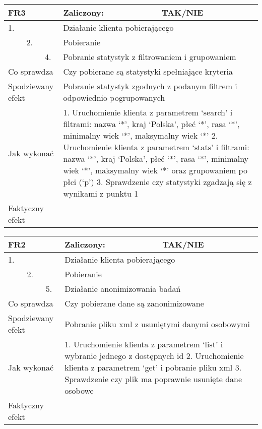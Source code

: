 \begin{tabular}{|p{20pt}|p{20pt}|p{20pt}|p{250pt}|p{60pt}|}
	\hline
	\multicolumn{3}{|p{70pt}|}{FR3} & Zaliczony: & TAK/NIE \\ \hline
	1. & & & \multicolumn{2}{|p{310pt}|}{Działanie klienta pobierającego } \\ \hline
	& 2. & & \multicolumn{2}{|p{310pt}|}{Pobieranie } \\ \hline
	& & 4. & \multicolumn{2}{|p{310pt}|}{Pobranie statystyk z filtrowaniem i grupowaniem } \\ \hline
	\multicolumn{3}{|p{70pt}|}{Co sprawdza} & \multicolumn{2}{|p{310pt}|}{Czy pobierane są statystyki spełniające kryteria} \\ \hline
	\multicolumn{3}{|p{70pt}|}{Spodziewany efekt} & \multicolumn{2}{|p{310pt}|}{Pobranie statystyk zgodnych z podanym filtrem i odpowiednio pogrupowanych} \\ \hline
	\multicolumn{3}{|p{70pt}|}{Jak wykonać} & \multicolumn{2}{|p{310pt}|}{1. Uruchomienie klienta z parametrem ‘search’ i filtrami: nazwa ‘*’, kraj ‘Polska’, płeć ‘*’, rasa ‘*’, minimalny wiek ‘*’, maksymalny wiek ‘*’
2. Uruchomienie klienta z parametrem ‘stats’ i filtrami: nazwa ‘*’, kraj ‘Polska’, płeć ‘*’, rasa ‘*’, minimalny wiek ‘*’, maksymalny wiek ‘*’ oraz grupowaniem po płci (‘p’)
3. Sprawdzenie czy statystyki zgadzają się z wynikami z punktu 1} \\ \hline
	\multicolumn{3}{|p{70pt}|}{Faktyczny efekt} & \multicolumn{2}{|p{310pt}|}{} \\ \hline
\end{tabular}

\begin{tabular}{|p{20pt}|p{20pt}|p{20pt}|p{250pt}|p{60pt}|}
	\hline
	\multicolumn{3}{|p{70pt}|}{FR2} & Zaliczony: & TAK/NIE \\ \hline
	1. & & & \multicolumn{2}{|p{310pt}|}{Działanie klienta pobierającego } \\ \hline
	& 2. & & \multicolumn{2}{|p{310pt}|}{Pobieranie } \\ \hline
	& & 5. & \multicolumn{2}{|p{310pt}|}{Działanie anonimizowania badań } \\ \hline
	\multicolumn{3}{|p{70pt}|}{Co sprawdza} & \multicolumn{2}{|p{310pt}|}{Czy pobierane dane są zanonimizowane} \\ \hline
	\multicolumn{3}{|p{70pt}|}{Spodziewany efekt} & \multicolumn{2}{|p{310pt}|}{Pobranie pliku xml z usuniętymi danymi osobowymi} \\ \hline
	\multicolumn{3}{|p{70pt}|}{Jak wykonać} & \multicolumn{2}{|p{310pt}|}{1. Uruchomienie klienta z parametrem ‘list’ i wybranie jednego z dostępnych id
2. Uruchomienie klienta z parametrem ‘get’ i pobranie pliku xml
3. Sprawdzenie czy plik ma poprawnie usunięte dane osobowe} \\ \hline
	\multicolumn{3}{|p{70pt}|}{Faktyczny efekt} & \multicolumn{2}{|p{310pt}|}{} \\ \hline
\end{tabular}

